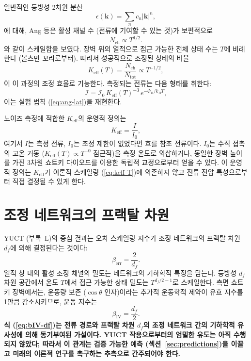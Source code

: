 \documentclass[12pt,a4paper]{article}
\newcommand{\Keff}{K_{\mathrm{eff}}}
\theoremstyle{remark}
\begin{document}
	일반적인 등방성 2차원 분산
	\begin{equation}
		\epsilon(\mathbf{k}) = \sum_n c_n |\mathbf{k}|^n,
		\label{eq:dispersion}
	\end{equation}
	에 대해, Ang 등은 활성 채널 수 (전류에 기여할 수 있는 것)가
	보편적으로
	\begin{equation}
		N_{\mathrm{ch}} \propto T^{1/2}.
		\label{eq:Nch}
	\end{equation}
	와 같이 스케일함을 보였다. 장벽 위의 열적으로 접근 가능한 전체 상태 수는
	$T$에 비례한다 (볼츠만 꼬리로부터). 따라서 성공적으로 조정된
	상태의 비율
	\begin{equation}
		\Keff(T) = \frac{N_{\mathrm{ch}}}{N_{\mathrm{tot}}} \propto T^{-1/2},
		\label{eq:keff-T}
	\end{equation}
	이 이 과정의 조정 효율로 기능한다. 측정되는 전류는 다음 형태를 취한다:
	\begin{equation}
		\mathcal{I} = \mathcal{I}_0 \, \Keff(T)^{-3} \, e^{-\Phi_B/k_B T},
		\label{eq:I-via-keff}
	\end{equation}
	이는 실험 법칙 (\ref{eq:ang-lat})을 재현한다.
	
	노이즈 측정에 적합한 $\Keff$의 운영적 정의는
	\begin{equation}
		\Keff = \frac{I}{I_0},
		\label{eq:keff-operational}
	\end{equation}
	여기서 $I$는 측정 전류, $I_0$는 조정 제한이 없었다면 흐를 참조 전류이다.
	$I_0$는 수직 접촉의 고온 거동 ($\Keff(T) \propto T^{-0}$ 점근적)을
	측정 온도로 외삽하거나, 동일한 장벽 높이를 가진 3차원 쇼트키 다이오드를
	이용한 독립적 교정으로부터 얻을 수 있다. 이 운영적 정의는 $\Keff$가
	이론적 스케일링 (\ref{eq:keff-T})에 의존하지 않고 전류-전압 특성으로부터
	직접 결정될 수 있게 한다.
	
	\section{조정 네트워크의 프랙탈 차원}
	
	YUCT (부록~L)의 중심 결과는 오차 스케일링 지수가 조정 네트워크의
	프랙탈 차원 $d_f$에 의해 결정된다는 것이다:
	\begin{equation}
		\beta_{\mathrm{err}} = \frac{2}{d_f}.
		\label{eq:beta-df}
	\end{equation}
	열적 창 내의 활성 조정 채널의 밀도는 네트워크의 기하학적 특징을
	담는다. 등방성 $d_f$ 차원 공간에서 온도 $T$에서 접근 가능한 상태 밀도는
	$T^{d_f/2 - 1}$로 스케일한다. 측면 쇼트키 장벽에서는,
	운동량 보존 ($\cos\theta$ 인자)이라는 추가적 운동학적 제약이
	유효 지수를 1만큼 감소시키므로, 운동 지수는
	\begin{equation}
		\beta_{\mathrm{IV}} = \frac{d_f}{2}.
		\label{eq:bIV-df}
	\end{equation}
	\textbf{식 (\ref{eq:bIV-df})는 전류 경로와 프랙탈 차원 $d_f$의
		조정 네트워크 간의 기하학적 유사성에 의해 동기부여된 가설이다.
		YUCT 작용으로부터의 엄밀한 유도는 아직 수행되지 않았다; 따라서 이 관계는
		검증 가능한 예측 (섹션~\ref{sec:predictions})을 이끌고 미래의 이론적
		연구를 촉구하는 추측으로 간주되어야 한다.}
	
\end{document}
